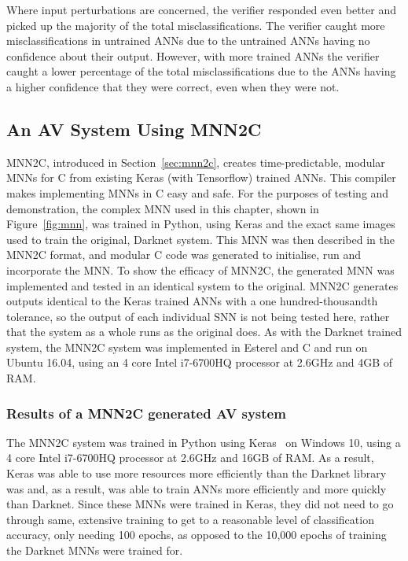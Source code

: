 Where input perturbations are concerned, the verifier responded even better and picked up the majority of the total misclassifications.
The verifier caught more misclassifications in untrained \acp{ANN} due to the untrained \acp{ANN} having no confidence about their output.
However, with more trained \acp{ANN} the verifier caught a lower percentage of the total misclassifications due to the \acp{ANN} having a higher confidence that they were correct, even when they were not.

\subsection{An \ac{AV} System Using \acf{MNN2C}}
\ac{MNN2C}, introduced in Section~\ref{sec:mnn2c}, creates time-predictable, modular \acfp{MNN} for C from existing Keras (with Tensorflow) trained \acp{ANN}. 
This compiler makes implementing \acfp{MNN} in C easy and safe.
For the purposes of testing and demonstration, the complex \ac{MNN} used in this chapter, shown in Figure~\ref{fig:mnn}, was trained in Python, using Keras and the exact same images used to train the original, Darknet system.
This \ac{MNN} was then described in the \ac{MNN2C} format, and modular C code was generated to initialise, run and incorporate the \ac{MNN}.
To show the efficacy of \ac{MNN2C}, the generated \ac{MNN} was implemented and tested in an identical system to the original. 
\ac{MNN2C} generates outputs identical to the Keras trained \acp{ANN} with a one hundred-thousandth tolerance, so the output of each individual \ac{SNN} is not being tested here, rather that the system as a whole runs as the original does.
As with the Darknet trained system, the \ac{MNN2C} system was implemented in Esterel and C and run on Ubuntu 16.04, using an 4 core Intel i7-6700HQ processor at 2.6GHz and 4GB of RAM.

\subsubsection{Results of a \ac{MNN2C} generated \ac{AV} system}
The \ac{MNN2C} system was trained in Python using Keras~\cite{chollet2015keras} on Windows 10, using a 4 core Intel i7-6700HQ processor at 2.6GHz and 16GB of RAM.
As a result, Keras was able to use more resources more efficiently than the Darknet library was and, as a result, was able to train \acp{ANN} more efficiently and more quickly than Darknet.
Since these \acp{MNN} were trained in Keras, they did not need to go through same, extensive training to get to a reasonable level of classification accuracy, only needing 100 epochs, as opposed to the 10,000 epochs of training the Darknet \acp{MNN} were trained for.

